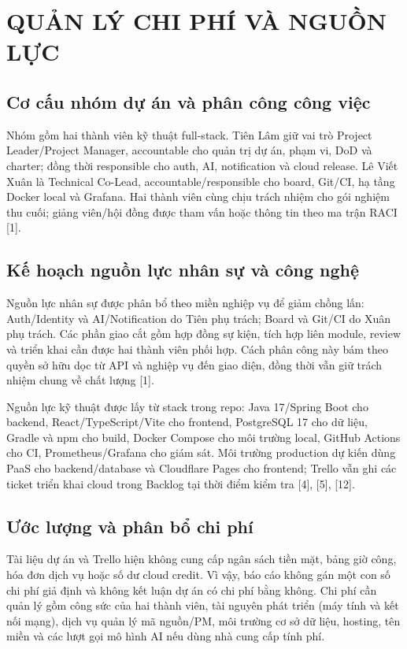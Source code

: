 \documentclass[12pt,a4paper]{report}
\begin{document}
\chapter{QUẢN LÝ CHI PHÍ VÀ NGUỒN LỰC}
\section{Cơ cấu nhóm dự án và phân công công việc}
Nhóm gồm hai thành viên kỹ thuật full-stack. Tiên Lâm giữ vai trò Project Leader/Project Manager, accountable cho quản trị dự án, phạm vi, DoD và charter; đồng thời responsible cho auth, AI, notification và cloud release. Lê Viết Xuân là Technical Co-Lead, accountable/responsible cho board, Git/CI, hạ tầng Docker local và Grafana. Hai thành viên cùng chịu trách nhiệm cho gói nghiệm thu cuối; giảng viên/hội đồng được tham vấn hoặc thông tin theo ma trận RACI [1].

\section{Kế hoạch nguồn lực nhân sự và công nghệ}
Nguồn lực nhân sự được phân bổ theo miền nghiệp vụ để giảm chồng lấn: Auth/Identity và AI/Notification do Tiên phụ trách; Board và Git/CI do Xuân phụ trách. Các phần giao cắt gồm hợp đồng sự kiện, tích hợp liên module, review và triển khai cần được hai thành viên phối hợp. Cách phân công này bám theo quyền sở hữu dọc từ API và nghiệp vụ đến giao diện, đồng thời vẫn giữ trách nhiệm chung về chất lượng [1].

Nguồn lực kỹ thuật được lấy từ stack trong repo: Java 17/Spring Boot cho backend, React/TypeScript/Vite cho frontend, PostgreSQL 17 cho dữ liệu, Gradle và npm cho build, Docker Compose cho môi trường local, GitHub Actions cho CI, Prometheus/Grafana cho giám sát. Môi trường production dự kiến dùng PaaS cho backend/database và Cloudflare Pages cho frontend; Trello vẫn ghi các ticket triển khai cloud trong Backlog tại thời điểm kiểm tra [4], [5], [12].

\section{Ước lượng và phân bổ chi phí}
Tài liệu dự án và Trello hiện không cung cấp ngân sách tiền mặt, bảng giờ công, hóa đơn dịch vụ hoặc số dư cloud credit. Vì vậy, báo cáo không gán một con số chi phí giả định và không kết luận dự án có chi phí bằng không. Chi phí cần quản lý gồm công sức của hai thành viên, tài nguyên phát triển (máy tính và kết nối mạng), dịch vụ quản lý mã nguồn/PM, môi trường cơ sở dữ liệu, hosting, tên miền và các lượt gọi mô hình AI nếu dùng nhà cung cấp tính phí.
\end{document}
